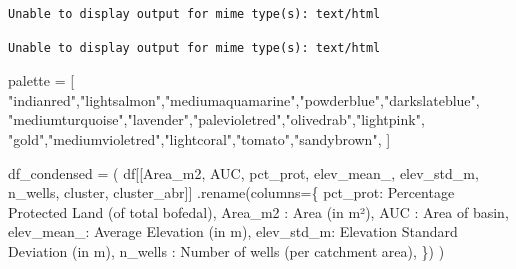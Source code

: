 \documentclass[
  letterpaper,
  DIV=11,
  numbers=noendperiod]{scrreprt}
\newenvironment{Shaded}{\begin{snugshade}}{\end{snugshade}}
\newcommand{\NormalTok}[1]{\textcolor[rgb]{0.00,0.23,0.31}{#1}}
\newcommand{\OperatorTok}[1]{\textcolor[rgb]{0.37,0.37,0.37}{#1}}
\newcommand{\StringTok}[1]{\textcolor[rgb]{0.13,0.47,0.30}{#1}}
\begin{document}
\begin{verbatim}
Unable to display output for mime type(s): text/html
\end{verbatim}

\begin{verbatim}
Unable to display output for mime type(s): text/html
\end{verbatim}

\begin{Shaded}
\begin{Highlighting}[]
\NormalTok{palette }\OperatorTok{=}\NormalTok{ [}
    \StringTok{"indianred"}\NormalTok{,}\StringTok{"lightsalmon"}\NormalTok{,}\StringTok{"mediumaquamarine"}\NormalTok{,}\StringTok{"powderblue"}\NormalTok{,}\StringTok{"darkslateblue"}\NormalTok{,}
    \StringTok{"mediumturquoise"}\NormalTok{,}\StringTok{"lavender"}\NormalTok{,}\StringTok{"palevioletred"}\NormalTok{,}\StringTok{"olivedrab"}\NormalTok{,}\StringTok{"lightpink"}\NormalTok{,}
    \StringTok{"gold"}\NormalTok{,}\StringTok{"mediumvioletred"}\NormalTok{,}\StringTok{"lightcoral"}\NormalTok{,}\StringTok{"tomato"}\NormalTok{,}\StringTok{"sandybrown"}\NormalTok{,}
\NormalTok{]}

\NormalTok{df\_condensed }\OperatorTok{=}\NormalTok{ (}
\NormalTok{    df[[}\StringTok{\textquotesingle{}Area\_m2\textquotesingle{}}\NormalTok{, }\StringTok{\textquotesingle{}AUC\textquotesingle{}}\NormalTok{, }\StringTok{\textquotesingle{}pct\_prot\textquotesingle{}}\NormalTok{, }\StringTok{\textquotesingle{}elev\_mean\_\textquotesingle{}}\NormalTok{, }\StringTok{\textquotesingle{}elev\_std\_m\textquotesingle{}}\NormalTok{,}
        \StringTok{\textquotesingle{}n\_wells\textquotesingle{}}\NormalTok{, }\StringTok{\textquotesingle{}cluster\textquotesingle{}}\NormalTok{, }\StringTok{\textquotesingle{}cluster\_abr\textquotesingle{}}\NormalTok{]]}
\NormalTok{      .rename(columns}\OperatorTok{=}\NormalTok{\{}
          \StringTok{\textquotesingle{}pct\_prot\textquotesingle{}}\NormalTok{: }\StringTok{\textquotesingle{}Percentage Protected Land (of total bofedal)\textquotesingle{}}\NormalTok{,}
          \StringTok{\textquotesingle{}Area\_m2\textquotesingle{}}\NormalTok{ : }\StringTok{\textquotesingle{}Area (in m²)\textquotesingle{}}\NormalTok{,}
          \StringTok{\textquotesingle{}AUC\textquotesingle{}}\NormalTok{     : }\StringTok{\textquotesingle{}Area of basin\textquotesingle{}}\NormalTok{,}
          \StringTok{\textquotesingle{}elev\_mean\_\textquotesingle{}}\NormalTok{: }\StringTok{\textquotesingle{}Average Elevation (in m)\textquotesingle{}}\NormalTok{,}
          \StringTok{\textquotesingle{}elev\_std\_m\textquotesingle{}}\NormalTok{: }\StringTok{\textquotesingle{}Elevation Standard Deviation (in m)\textquotesingle{}}\NormalTok{,}
          \StringTok{\textquotesingle{}n\_wells\textquotesingle{}}\NormalTok{   : }\StringTok{\textquotesingle{}Number of wells (per catchment area)\textquotesingle{}}\NormalTok{,}
\NormalTok{      \})}
\NormalTok{)}


\end{Highlighting}
\end{Shaded}
\end{document}

